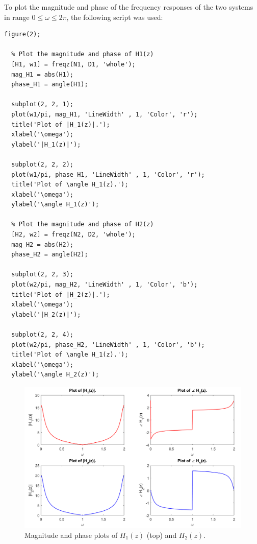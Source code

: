\documentclass[a4paper, 10pt]{article}
\begin{document}
\hfill

\noindent To plot the magnitude and phase of the frequency responses of the two systems in range $0\leq\omega\leq2\pi$,
the following script was used:
\begin{lstlisting}[style=Matlab-editor, basicstyle=\small\ttfamily]
  figure(2);

  % Plot the magnitude and phase of H1(z)
  [H1, w1] = freqz(N1, D1, 'whole');
  mag_H1 = abs(H1);
  phase_H1 = angle(H1);

  subplot(2, 2, 1);
  plot(w1/pi, mag_H1, 'LineWidth' , 1, 'Color', 'r');
  title('Plot of |H_1(z)|.');
  xlabel('\omega');
  ylabel('|H_1(z)|');

  subplot(2, 2, 2);
  plot(w1/pi, phase_H1, 'LineWidth' , 1, 'Color', 'r');
  title('Plot of \angle H_1(z).');
  xlabel('\omega');
  ylabel('\angle H_1(z)');

  % Plot the magnitude and phase of H2(z)
  [H2, w2] = freqz(N2, D2, 'whole');
  mag_H2 = abs(H2);
  phase_H2 = angle(H2);

  subplot(2, 2, 3);
  plot(w2/pi, mag_H2, 'LineWidth' , 1, 'Color', 'b');
  title('Plot of |H_2(z)|.');
  xlabel('\omega');
  ylabel('|H_2(z)|');

  subplot(2, 2, 4);
  plot(w2/pi, phase_H2, 'LineWidth' , 1, 'Color', 'b');
  title('Plot of \angle H_1(z).');
  xlabel('\omega');
  ylabel('\angle H_2(z)');
\end{lstlisting}
\begin{figure}[H]
  \centering
  \includegraphics[width=14cm]{images/q2_b.png}
  \caption{Magnitude and phase plots of $H_1(z)$ (top) and $H_2(z)$.}
\end{figure}

\hfill
\end{document}
